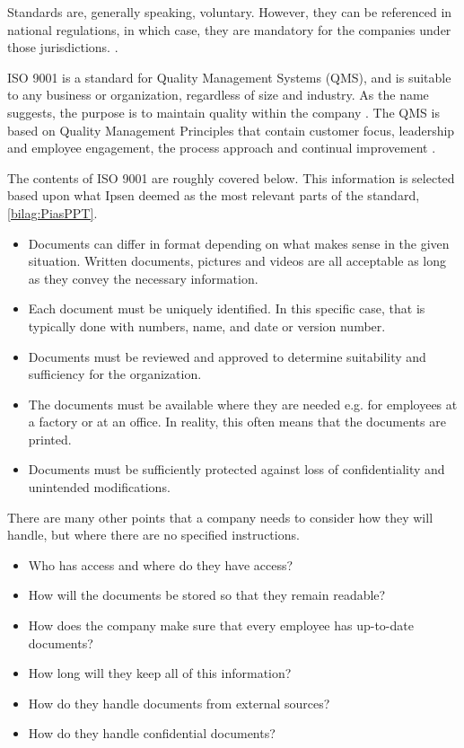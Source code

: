 Standards are, generally speaking, voluntary.
However, they can be referenced in national regulations, in which case, they are mandatory for the companies under those jurisdictions. \cite{ISOreviewedevery5years}.

ISO 9001 is a standard for Quality Management Systems (QMS), and is suitable to any business or organization, regardless of size and industry.
As the name suggests, the purpose is to maintain quality within the company \cite{ISO9001}.
The QMS is based on Quality Management Principles that contain customer focus, leadership and employee engagement, the process approach and continual improvement \cite{ISO9001-2}.

The contents of ISO 9001 are roughly covered below.
This information is selected based upon what Ipsen deemed as the most relevant parts of the standard, \cref{bilag:PiasPPT}.

\begin{itemize}
	\item
	Documents can differ in format depending on what makes sense in the given situation. 
	Written documents, pictures and videos are all acceptable as long as they convey the necessary information.
	\item
	Each document must be uniquely identified.
	In this specific case, that is typically done with numbers, name, and date or version number.
	\item
	Documents must be reviewed and approved to determine suitability and sufficiency for the organization.
	\item
	The documents must be available where they are needed e.g. for employees at a factory or at an office.
	In reality, this often means that the documents are printed.
	\item
	Documents must be sufficiently protected against loss of confidentiality and unintended modifications.
\end{itemize}

There are many other points that a company needs to consider how they will handle, but where there are no specified instructions.

\begin{itemize}
	\item Who has access and where do they have access?
	\item How will the documents be stored so that they remain readable?
	\item How does the company make sure that every employee has up-to-date documents?
	\item How long will they keep all of this information?
	\item How do they handle documents from external sources?
	\item How do they handle confidential documents?
\end{itemize}

